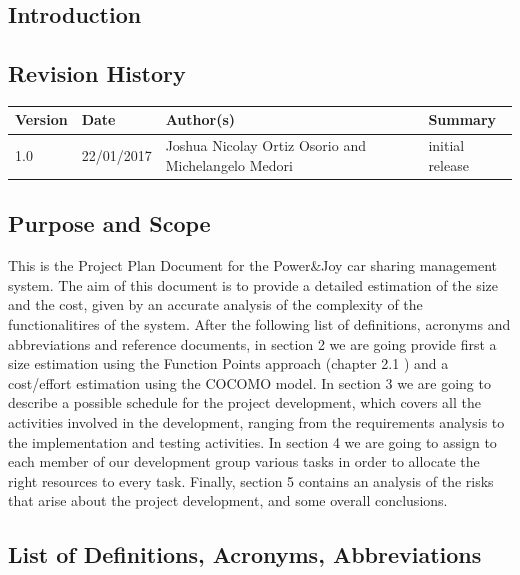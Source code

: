 \documentclass{article}
\begin{document}
\newpage   
\begin{flushleft}  

  \section{Introduction}	%
  \subsection{Revision History} 	%
  
  \begin{center}
    \begin{tabular}{ | p{2cm} | p{2cm} |  p{7 cm} | p{4cm} |}
    \hline
    \textbf{Version} &  \textbf{Date} & \textbf{Author(s)} & \textbf{Summary}  \\ 
    \hline
    
    1.0 & 22/01/2017 & Joshua Nicolay Ortiz Osorio and Michelangelo Medori & initial release
     \\ 
  \hline

  
    \end{tabular}
\end{center}
\vspace{1cm}
\subsection{Purpose and Scope} %
This is the Project Plan Document for the Power\&Joy car sharing management system. The aim of this document is to provide a detailed estimation of the size and the cost, given by an accurate analysis of the complexity of the functionalitires  of the system.
After the following list of definitions, acronyms and abbreviations and reference documents, in section 2 we are going provide first a size estimation using the Function Points approach (chapter 2.1 ) and a cost/effort estimation using the COCOMO model. 
In section 3 we are going to describe a possible schedule for the project development, which  covers all the activities involved in the development, ranging  from the requirements analysis to the implementation and testing activities.
In section 4 we are going to assign to each member of our development group various tasks in order to allocate the right resources to every task. 
Finally, section 5 contains an analysis of the risks that arise about the project development, and some overall conclusions.

\newpage
\subsection{List of Definitions, Acronyms, Abbreviations} %

\end{flushleft}
\end{document}
